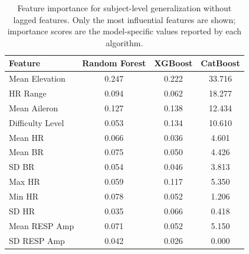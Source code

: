 \documentclass[11pt, a4paper]{article}
\begin{document}
\begin{table}[htbp]
	\centering
	\caption{Feature importance for subject-level generalization without lagged
		features. Only the most influential features are shown; importance
		scores are the model-specific values reported by each algorithm.}
	\label{tab:featimp_subject_nolag}
	\begin{tabular}{lccc}
		\toprule
		Feature & Random Forest & XGBoost & CatBoost \\
		\midrule
		Mean Elevation       & 0.247 & 0.222 & 33.716 \\
		HR Range            & 0.094 & 0.062 & 18.277 \\
		Mean Aileron        & 0.127 & 0.138 & 12.434 \\
		Difficulty Level    & 0.053 & 0.134 & 10.610 \\
		Mean HR             & 0.066 & 0.036 &  4.601 \\
		Mean BR             & 0.075 & 0.050 &  4.426 \\
		SD BR              & 0.054 & 0.046 &  3.813 \\
		Max HR              & 0.059 & 0.117 &  5.350 \\
		Min HR              & 0.078 & 0.052 &  1.206 \\
		SD HR             & 0.035 & 0.066 &  0.418 \\
		Mean RESP Amp       & 0.071 & 0.052 &  5.150 \\
		SD RESP Amp        & 0.042 & 0.026 &  0.000 \\
		\bottomrule
	\end{tabular}
\end{table}
\end{document}
